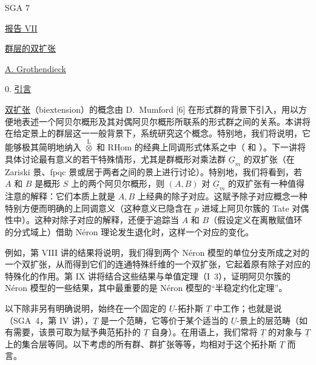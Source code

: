 

\begin{center}
SGA 7

\vspace{1em}
\underline{报告 VII}

\vspace{1em}
\underline{群层的双扩张}

\vspace{1em}
\underline{A. Grothendieck}
\end{center}

0. \underline{引言}

\underline{双扩张}（biextension）的概念由 D.~Mumford [6] 在形式群的背景下引入，用以方便地表述一个阿贝尔概形及其对偶阿贝尔概形所联系的形式群之间的关系。本讲将在给定景上的群层这一一般背景下，系统研究这个概念。特别地，我们将说明，它能够极其简明地纳入 $\overset{\mathrm L}{\otimes}$ 和 $\underline{\mathrm{RHom}}$ 的经典上同调形式体系之中（ 和 ）。下一讲将具体讨论最有意义的若干特殊情形，尤其是群概形对乘法群 $\underline G_m$ 的双扩张（在 Zariski 景、fpqc 景或居于两者之间的景上进行讨论）。特别地，我们将看到，若 $A$ 和 $B$ 是概形 $S$ 上的两个阿贝尔概形，则 $(A,B)$ 对 $\underline G_m$ 的双扩张有一种值得注意的解释：它们本质上就是 $A,B$ 上经典的除子对应。这赋予除子对应概念一种特别方便而明确的上同调意义（这种意义已隐含在 $p$ 进域上阿贝尔簇的 Tate 对偶性中）。这种对除子对应的解释，还便于追踪当 $A$ 和 $B$（假设定义在离散赋值环的分式域上）借助 N\'eron 理论发生退化时，这样一个对应的变化。


例如，第 VIII 讲的结果将说明，我们得到两个 N\'eron 模型的单位分支所成之对的一个双扩张，从而得到它们的连通特殊纤维的一个双扩张，它起着原有除子对应的特殊化的作用。第 IX 讲将结合这些结果与单值定理（I~3），证明阿贝尔簇的 N\'eron 模型的一些结果，其中最重要的是 N\'eron 模型的“半稳定约化定理”。

以下除非另有明确说明，始终在一个固定的 $\underline U$-拓扑斯 $\underline T$ 中工作；也就是说（SGA~4，第 IV 讲），$\underline T$ 是一个范畴，它等价于某个适当的 $\underline U$-景上的层范畴（如有需要，该景可取为赋予典范拓扑的 $\underline T$ 自身）。在用语上，我们常将 $\underline T$ 的对象与 $\underline T$ 上的集合层等同。以下考虑的所有群、群扩张等等，均相对于这个拓扑斯 $\underline T$ 而言。

